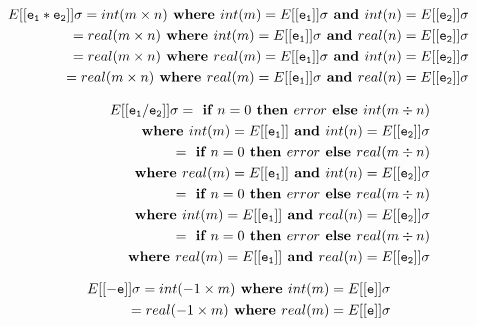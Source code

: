 \documentclass[12pt]{article}
\begin{document}
\begin{align*}
E[[{\tt e_1 * e_2}]] \sigma = int(m \times n) \textbf{ where } int(m) = E[[{\tt e_1}]] \sigma \textbf{ and } int(n) = E[[{\tt e_2}]] \sigma \\
                            = real(m \times n) \textbf{ where } int(m) = E[[{\tt e_1}]] \sigma \textbf{ and } real(n) = E[[{\tt e_2}]] \sigma \\
                   = real(m \times n) \textbf{ where } real(m) = E[[{\tt e_1}]] \sigma \textbf{ and } int(n) = E[[{\tt e_2}]] \sigma \\
                   = real(m \times n) \textbf{ where } real(m) = E[[{\tt e_1}]] \sigma \textbf{ and } real(n) = E[[{\tt e_2}]] \sigma \\
\end{align*}

\begin{align*}
E[[{\tt e_1 / e_2}]] \sigma = \textbf{ if } n = 0 \textbf{ then } error \textbf{ else } int(m \div n) \\
\textbf{\hspace{5em}where } int(m) = E[[{\tt e_1}]] \textbf{ and } int(n) = E[[{\tt e_2}]] \sigma \\
                            = \textbf{ if } n = 0 \textbf{ then } error \textbf{ else } real(m \div n) \\
\textbf{\hspace{5em}where } real(m) = E[[{\tt e_1}]] \textbf{ and } int(n) = E[[{\tt e_2}]] \sigma \\
							= \textbf{ if } n = 0 \textbf{ then } error \textbf{ else } real(m \div n) \\
\textbf{\hspace{5em}where } int(m) = E[[{\tt e_1}]] \textbf{ and } real(n) = E[[{\tt e_2}]] \sigma \\
							= \textbf{ if } n = 0 \textbf{ then } error \textbf{ else } real(m \div n) \\
\textbf{\hspace{5em}where } real(m) = E[[{\tt e_1}]] \textbf{ and } real(n) = E[[{\tt e_2}]] \sigma \\
\end{align*}

\begin{align*}
E[[{\tt -e}]] \sigma = int(-1 \times m) \textbf{ where } int(m) = E[[{\tt e}]] \sigma \\
                     = real(-1 \times m) \textbf{ where } real(m) = E[[{\tt e}]] \sigma \\
\end{align*}
\end{document}
